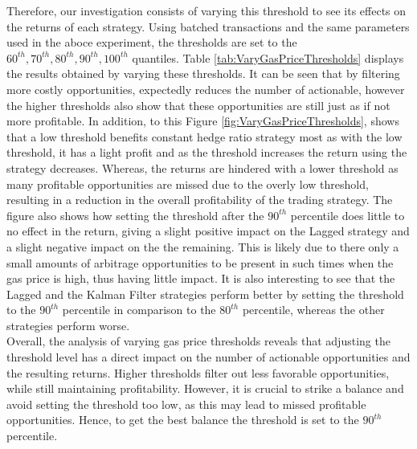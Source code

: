 \noindent Therefore, our investigation  consists of varying this threshold to see its effects on the returns of each strategy. Using batched transactions and the same parameters used in the aboce experiment, the thresholds are set to the $60^{th}, 70^{th},80^{th},90^{th},100^{th}$ quantiles. Table \ref{tab:VaryGasPriceThresholds} displays the results obtained by varying these thresholds. It can be seen that by filtering more costly opportunities, expectedly reduces the number of actionable, however the higher thresholds also show that these opportunities are still just as if not more profitable. In addition, to this Figure \ref{fig:VaryGasPriceThresholds}, shows that a low threshold benefits constant hedge ratio strategy most as with the low threshold, it has a light profit and as the threshold increases the return using the strategy decreases. Whereas, the returns are hindered with a lower threshold as many profitable opportunities are missed due to the overly low threshold, resulting in a reduction in the overall profitability of the trading strategy. The figure also shows how setting the threshold after the $90^{th}$ percentile does little to no effect in the return, giving a slight positive impact on the Lagged strategy and a slight negative impact on the the remaining. This is likely due to there only a small amounts of arbitrage opportunities to be present in such times when the gas price is high, thus having little impact. It is also interesting to see that the Lagged and the Kalman Filter strategies perform better by setting the threshold to the $90^{th}$ percentile in comparison to the $80^{th}$ percentile, whereas the other strategies perform worse.
\\[5mm]
Overall, the analysis of varying gas price thresholds reveals that adjusting the threshold level has a direct impact on the number of actionable opportunities and the resulting returns. Higher thresholds filter out less favorable opportunities, while still maintaining profitability. However, it is crucial to strike a balance and avoid setting the threshold too low, as this may lead to missed profitable opportunities. Hence, to get the best balance the threshold is set to the $90^{th}$ percentile.

